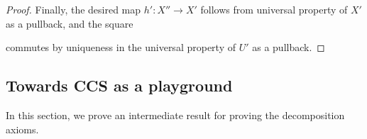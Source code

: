 \documentclass{LMCS}
\theoremstyle{plain}\newtheorem{satz}[thm]{Satz}
\begin{document}
\begin{proof}
  Finally, the desired map $h' \colon X'' \to X'$ follows from
  universal property of $X'$ as a pullback, and the square
  \begin{center}
  \end{center}
  commutes by uniqueness in the universal property of $U'$ as a
  pullback.
\end{proof}

\subsection{Towards CCS as a playground}
In this section, we prove an intermediate result for proving the
decomposition axioms.
\end{document}
